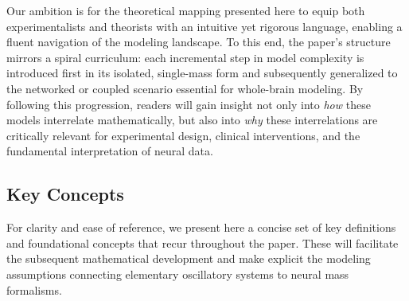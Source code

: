\documentclass[12pt]{article}
\numberwithin{equation}{section}
\begin{document}
Our ambition is for the theoretical mapping presented here to equip both experimentalists and theorists with an intuitive yet rigorous language, enabling a fluent navigation of the modeling landscape. To this end, the paper's structure mirrors a spiral curriculum: each incremental step in model complexity is introduced first in its isolated, single-mass form and subsequently generalized to the networked or coupled scenario essential for whole-brain modeling. By following this progression, readers will gain insight not only into \emph{how} these models interrelate mathematically, but also into \emph{why} these interrelations are critically relevant for experimental design, clinical interventions, and the fundamental interpretation of neural data.


\subsection{Key Concepts}

For clarity and ease of reference, we present here a concise set of key definitions and foundational concepts that recur throughout the paper. 
These will facilitate the subsequent mathematical development and make explicit the modeling assumptions connecting elementary oscillatory systems to neural mass formalisms.
\end{document}
